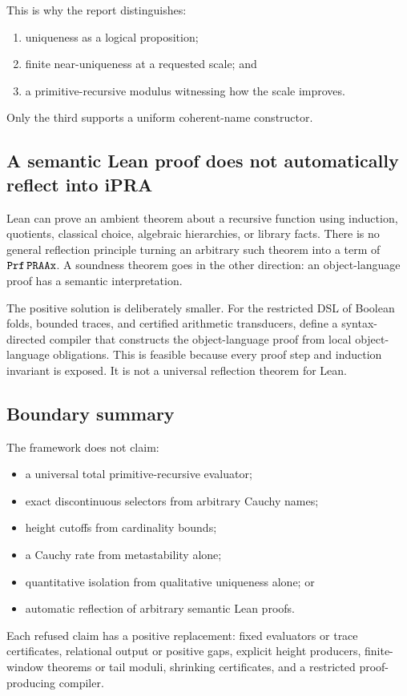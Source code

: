 This is why the report distinguishes:

\begin{enumerate}
\item uniqueness as a logical proposition;
\item finite near-uniqueness at a requested scale; and
\item a primitive-recursive modulus witnessing how the scale improves.
\end{enumerate}

Only the third supports a uniform coherent-name constructor.

\subsection{A semantic Lean proof does not automatically reflect into iPRA}

Lean can prove an ambient theorem about a recursive function using induction,
quotients, classical choice, algebraic hierarchies, or library facts.  There is
no general reflection principle turning an arbitrary such theorem into a term
of \(\texttt{Prf}\,\texttt{PRAAx}\).  A soundness theorem goes in the other direction: an
object-language proof has a semantic interpretation.

The positive solution is deliberately smaller.  For the restricted DSL of
Boolean folds, bounded traces, and certified arithmetic transducers, define a
syntax-directed compiler that constructs the object-language proof from local
object-language obligations.  This is feasible because every proof step and
induction invariant is exposed.  It is not a universal reflection theorem for
Lean.

\subsection{Boundary summary}

The framework does not claim:

\begin{itemize}
\item a universal total primitive-recursive evaluator;
\item exact discontinuous selectors from arbitrary Cauchy names;
\item height cutoffs from cardinality bounds;
\item a Cauchy rate from metastability alone;
\item quantitative isolation from qualitative uniqueness alone; or
\item automatic reflection of arbitrary semantic Lean proofs.
\end{itemize}

Each refused claim has a positive replacement: fixed evaluators or trace
certificates, relational output or positive gaps, explicit height producers,
finite-window theorems or tail moduli, shrinking certificates, and a restricted
proof-producing compiler.
